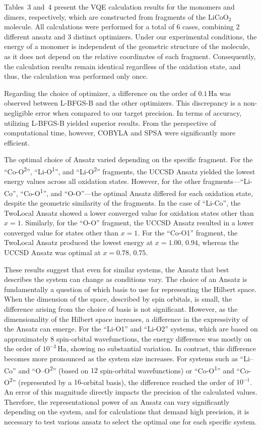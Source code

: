 \documentclass[pdflatex,sn-mathphys-num]{sn-jnl}%
\theoremstyle{thmstyleone}%
\theoremstyle{thmstyletwo}%
\theoremstyle{thmstylethree}%
\begin{document}
Tables~3 and~4 present the VQE calculation results for the monomers and dimers, respectively, which are constructed from fragments of the \(\mathrm{LiCoO_2}\) molecule. All calculations were performed for a total of $6$ cases, combining $2$ different ansatz and $3$ distinct optimizers. Under our experimental conditions, the energy of a monomer is independent of the geometric structure of the molecule, as it does not depend on the relative coordinates of each fragment. Consequently, the calculation results remain identical regardless of the oxidation state, and thus, the calculation was performed only once.

Regarding the choice of optimizer, a difference on the order of \(0.1\,\mathrm{Ha}\) was observed between L-BFGS-B and the other optimizers. This discrepancy is a non-negligible error when compared to our target precision. In terms of accuracy, utilizing L-BFGS-B yielded superior results. From the perspective of computational time, however, COBYLA and SPSA were significantly more efficient.

The optimal choice of Ansatz varied depending on the specific fragment. For the ``Co-O\textsuperscript{2}'', ``Li-O\textsuperscript{1}'', and ``Li-O\textsuperscript{2}'' fragments, the UCCSD Ansatz yielded the lowest energy values across all oxidation states. However, for the other fragments---``Li-Co'', ``Co-O\textsuperscript{1}'', and ``O-O''---the optimal Ansatz differed for each oxidation state, despite the geometric similarity of the fragments. In the case of ``Li-Co'', the TwoLocal Ansatz showed a lower converged value for oxidation states other than \(x=1\). Similarly, for the ``O-O'' fragment, the UCCSD Ansatz resulted in a lower converged value for states other than \(x=1\). For the ``Co-O1'' fragment, the TwoLocal Ansatz produced the lowest energy at \(x=1.00,\,0.94\), whereas the UCCSD Ansatz was optimal at \(x=0.78,\,0.75\).

These results suggest that even for similar systems, the Ansatz that best describes the system can change as conditions vary. The choice of an Ansatz is fundamentally a question of which basis to use for representing the Hilbert space. When the dimension of the space, described by spin orbitals, is small, the difference arising from the choice of basis is not significant. However, as the dimensionality of the Hilbert space increases, a difference in the expressivity of the Ansatz can emerge. For the ``Li-O1'' and ``Li-O2'' systems, which are based on approximately $8$ spin-orbital wavefunctions, the energy difference was mostly on the order of \(10^{-3}\,\mathrm{Ha}\), showing no substantial variation. In contrast, this difference becomes more pronounced as the system size increases. For systems such as ``Li--Co'' and ``O--O\textsuperscript{2}'' (based on $12$ spin-orbital wavefunctions) or ``Co-O\textsuperscript{1}'' and ``Co-O\textsuperscript{2}'' (represented by a $16$-orbital basis), the difference reached the order of \(10^{-1}\). An error of this magnitude directly impacts the precision of the calculated values. Therefore, the representational power of an Ansatz can vary significantly depending on the system, and for calculations that demand high precision, it is necessary to test various ansatz to select the optimal one for each specific system.
\end{document}
